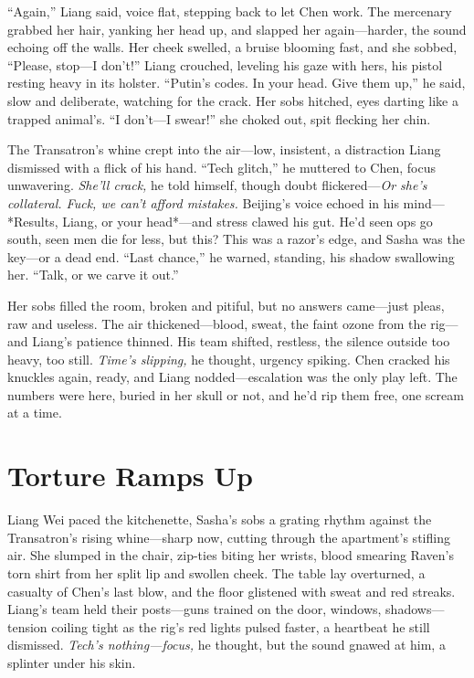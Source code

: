 \documentclass[12pt]{book}
\begin{document}
“Again,” Liang said, voice flat, stepping back to let Chen work. The mercenary grabbed her hair, yanking her head up, and slapped her again—harder, the sound echoing off the walls. Her cheek swelled, a bruise blooming fast, and she sobbed, “Please, stop—I don’t!” Liang crouched, leveling his gaze with hers, his pistol resting heavy in its holster. “Putin’s codes. In your head. Give them up,” he said, slow and deliberate, watching for the crack. Her sobs hitched, eyes darting like a trapped animal’s. “I don’t—I swear!” she choked out, spit flecking her chin.

The Transatron’s whine crept into the air—low, insistent, a distraction Liang dismissed with a flick of his hand. “Tech glitch,” he muttered to Chen, focus unwavering. \textit{She’ll crack,} he told himself, though doubt flickered—\textit{Or she’s collateral. Fuck, we can’t afford mistakes.} Beijing’s voice echoed in his mind—*Results, Liang, or your head*—and stress clawed his gut. He’d seen ops go south, seen men die for less, but this? This was a razor’s edge, and Sasha was the key—or a dead end. “Last chance,” he warned, standing, his shadow swallowing her. “Talk, or we carve it out.”

Her sobs filled the room, broken and pitiful, but no answers came—just pleas, raw and useless. The air thickened—blood, sweat, the faint ozone from the rig—and Liang’s patience thinned. His team shifted, restless, the silence outside too heavy, too still. \textit{Time’s slipping,} he thought, urgency spiking. Chen cracked his knuckles again, ready, and Liang nodded—escalation was the only play left. The numbers were here, buried in her skull or not, and he’d rip them free, one scream at a time.

\section{Torture Ramps Up}

Liang Wei paced the kitchenette, Sasha’s sobs a grating rhythm against the Transatron’s rising whine—sharp now, cutting through the apartment’s stifling air. She slumped in the chair, zip-ties biting her wrists, blood smearing Raven’s torn shirt from her split lip and swollen cheek. The table lay overturned, a casualty of Chen’s last blow, and the floor glistened with sweat and red streaks. Liang’s team held their posts—guns trained on the door, windows, shadows—tension coiling tight as the rig’s red lights pulsed faster, a heartbeat he still dismissed. \textit{Tech’s nothing—focus,} he thought, but the sound gnawed at him, a splinter under his skin.
\end{document}
